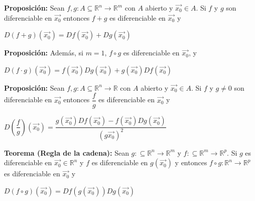 \documentclass[12pt]{article}
\begin{document}
\noindent \textbf{Proposición:} Sean $f,g:A\subseteq\mathbb{R}^n\rightarrow\mathbb{R}^m$ con $A$ abierto y $\vec{x_0}\in A$. Si $f$ y $g$ son diferenciable en 
$\vec{x_0}$ entonces $f+g$ es diferenciable en $\vec{x_0}$ y 
\begin{center}
    $D(f+g)(\vec{x_0})=Df(\vec{x_0})+Dg(\vec{x_0})$
\end{center}

\noindent \textbf{Proposición: }Además, si $m=1$, $f\circ g$ es diferenciable en $\vec{x_0}$, y 
\begin{center}
    $D(f\cdot g)(\vec{x_0})=f(\vec{x_0})Dg(\vec{x_0})+g(\vec{x_0})Df(\vec{x_0})$
\end{center}

\noindent \textbf{Proposición:} Sean $f,g:A\subseteq\mathbb{R}^n\rightarrow\mathbb{R}$ con $A$ abierto y $\vec{x_0}\in A$. Si $f$ y $g\not=0$ son diferenciable en 
$\vec{x_0}$ entonces $\dfrac{f}{g}$ es diferenciable en $\vec{x_0}$ y 
\begin{center}
    $D(\dfrac{f}{g})(\vec{x_0})=\dfrac{g(\vec{x_0})Df(\vec{x_0})-f(\vec{x_0})Dg(\vec{x_0})}{(g{\vec{x_0}})^2}$
\end{center}

\noindent \textbf{Teorema (Regla de la cadena):} Sean $g:\subseteq\mathbb{R}^n\rightarrow\mathbb{R}^m$ y $f:\subseteq\mathbb{R}^m\rightarrow\mathbb{R}^p$.
Si $g$ es diferenciable en $\vec{x_0}\in \mathbb{R}^n$ y $f$ es diferenciable en $g(\vec{x_0})$ y entonces
$f\circ g:\mathbb{R}^n\rightarrow\mathbb{R}^p$ es diferenciable en $\vec{x_0}$ y
\begin{center}
    $D(f\circ g)(\vec{x_0})=Df(g(\vec{x_0}))Dg(\vec{x_0})$
\end{center}
\end{document}
